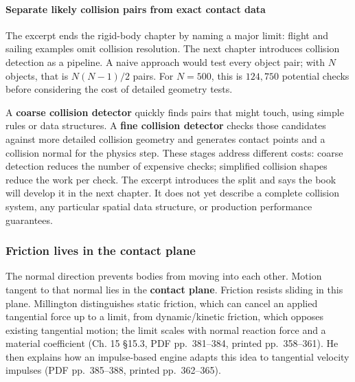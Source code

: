 \paragraph{Separate likely collision pairs from exact contact data}\label{06-engine-ii-ch033-separate-likely-collision-pairs-from-exact-contact-data}

\hypertarget{06-engine-ii-ch033-separate-likely-collision-pairs-from-exact-contact-data}{}

The excerpt ends the rigid-body chapter by naming a major limit: flight and sailing examples omit collision resolution. The next chapter introduces collision detection as a pipeline. A naive approach would test every object pair; with \(N\) objects, that is \(N(N-1)/2\) pairs. For \(N=500\), this is \(124{,}750\) potential checks before considering the cost of detailed geometry tests.

A \textbf{coarse collision detector} quickly finds pairs that might touch, using simple rules or data structures. A \textbf{fine collision detector} checks those candidates against more detailed collision geometry and generates contact points and a collision normal for the physics step. These stages address different costs: coarse detection reduces the number of expensive checks; simplified collision shapes reduce the work per check. The excerpt introduces the split and says the book will develop it in the next chapter. It does not yet describe a complete collision system, any particular spatial data structure, or production performance guarantees.

\subsubsection{Friction lives in the contact plane}\label{06-engine-ii-ch033-friction-lives-in-the-contact-plane}

\hypertarget{06-engine-ii-ch033-friction-lives-in-the-contact-plane}{}

The normal direction prevents bodies from moving into each other. Motion tangent to that normal lies in the \textbf{contact plane}. Friction resists sliding in this plane. Millington distinguishes static friction, which can cancel an applied tangential force up to a limit, from dynamic/kinetic friction, which opposes existing tangential motion; the limit scales with normal reaction force and a material coefficient (Ch. 15 §15.3, PDF pp.~381--384, printed pp.~358--361). He then explains how an impulse-based engine adapts this idea to tangential velocity impulses (PDF pp.~385--388, printed pp.~362--365).

